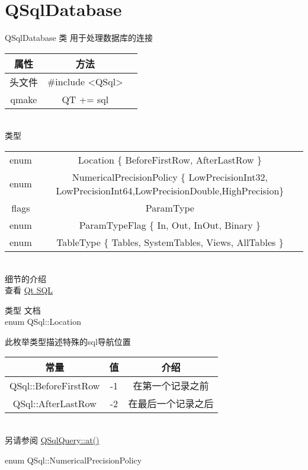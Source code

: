 \chapter{QSqlDatabase}
QSqlDatabase 类 用于处理数据库的连接

\begin{tabular}{|c|c|p{1.5cm}|}
	\hline
	属性 & 方法 \\
	\hline
	头文件 & \#include <QSql>\\      
	\hline
	qmake & QT += sql\\      
	\hline
\end{tabular}\\

类型

\begin{tabular}{|c|c|}
	\hline
	&  \\
	\hline
	enum & Location \{ BeforeFirstRow, AfterLastRow \}\\      
	\hline
	enum & NumericalPrecisionPolicy \{ LowPrecisionInt32, LowPrecisionInt64,LowPrecisionDouble,HighPrecision\}\\      
	\hline
	flags & ParamType \\
	\hline 
	enum & ParamTypeFlag \{ In, Out, InOut, Binary \} \\ 
	\hline
	enum & TableType \{ Tables, SystemTables, Views, AllTables \}\\
	\hline
\end{tabular}\\

细节的介绍 \\

查看 \href{https://doc.qt.io/qt-5/qtsql-index.html}{Qt SQL}

类型 文档\\ 

enum QSql::Location


此枚举类型描述特殊的sql导航位置


\begin{tabular}{|c|c|c|}
	\hline
	常量	& 值 & 介绍 \\
	\hline
	QSql::BeforeFirstRow&-1&在第一个记录之前\\
	\hline
	QSql::AfterLastRow&-2&在最后一个记录之后\\
	\hline
\end{tabular}\\

另请参阅 \href{https://doc.qt.io/qt-5/qsqlquery.html#at}{QSqlQuery::at()}

enum QSql::NumericalPrecisionPolicy


